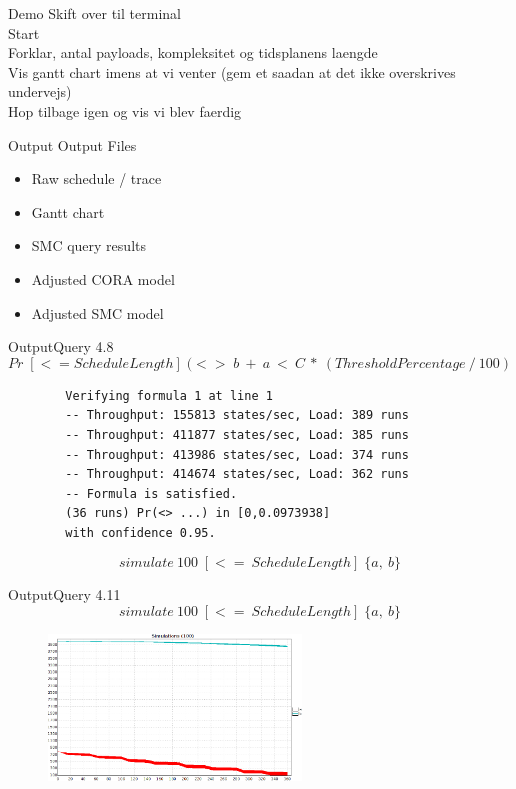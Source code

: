 \begin{frame}{Demo}{}
	Skift over til terminal\\
	Start\\
	Forklar, antal payloads, kompleksitet og tidsplanens laengde\\
	Vis gantt chart imens at vi venter (gem et saadan at det ikke overskrives undervejs)\\
	Hop tilbage igen og vis vi blev faerdig
\end{frame}

\begin{frame}{Output}{}
	Output Files
	\begin{itemize}
		\item Raw schedule / trace
		\item Gantt chart
		\item SMC query results
		\item Adjusted CORA model
		\item Adjusted SMC model
	\end{itemize}
\end{frame}

\begin{frame}[fragile]{Output}{Query 4.8}
	\begin{equation*}
		Pr\; [<=ScheduleLength] \; (<>\; b\ +\ a\ <\ C\ *\ (ThresholdPercentage\ /\ 100)
	\end{equation*}
	\begin{lstlisting}
		Verifying formula 1 at line 1
		-- Throughput: 155813 states/sec, Load: 389 runs
		-- Throughput: 411877 states/sec, Load: 385 runs
		-- Throughput: 413986 states/sec, Load: 374 runs
		-- Throughput: 414674 states/sec, Load: 362 runs
		-- Formula is satisfied.
		(36 runs) Pr(<> ...) in [0,0.0973938]
		with confidence 0.95.
	\end{lstlisting}
	\pause
	\begin{equation*}
		simulate\ 100 \; [<=\ ScheduleLength]\; \{ a,\ b\}
	\end{equation*}
\end{frame}

\begin{frame}{Output}{Query 4.11}
	\begin{equation*}
		simulate\ 100 \; [<=\ ScheduleLength]\; \{ a,\ b\}
	\end{equation*}
	\begin{figure}
		\includegraphics[width=0.60\textwidth]{graphics/ab.png}
		\end{figure}
\end{frame}

